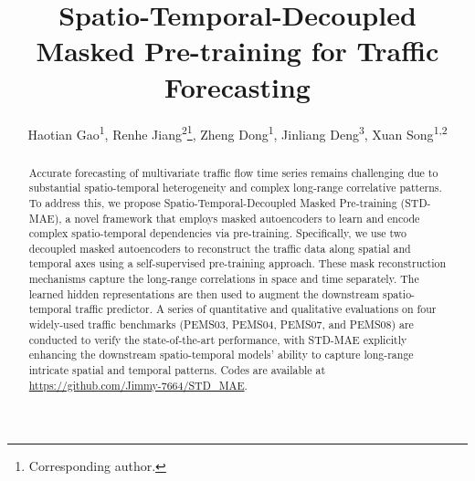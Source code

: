 \documentclass[letterpaper]{article} \usepackage{aaai24}  \usepackage{times}  \usepackage{helvet}  \usepackage{courier}  \usepackage[hyphens]{url}  \usepackage{graphicx} \urlstyle{rm} \def\UrlFont{\rm}  \usepackage{natbib}  \usepackage{caption} \frenchspacing  \setlength{\pdfpagewidth}{8.5in} \setlength{\pdfpageheight}{11in} \usepackage{algorithm}
\title{Spatio-Temporal-Decoupled Masked Pre-training for Traffic Forecasting }
\author{
    Haotian Gao\textsuperscript{\rm 1},
    Renhe Jiang\textsuperscript{\rm 2}\thanks{Corresponding author.},    
    Zheng Dong\textsuperscript{\rm 1},
    Jinliang Deng\textsuperscript{\rm 3},
    Xuan Song\textsuperscript{\rm 1,2}
}
\begin{document}
\maketitle

\begin{abstract}
Accurate forecasting of multivariate traffic flow time series remains challenging due to substantial spatio-temporal heterogeneity and complex long-range correlative patterns. To address this, we propose Spatio-Temporal-Decoupled Masked Pre-training (STD-MAE), a novel framework that employs masked autoencoders to learn and encode complex spatio-temporal dependencies via pre-training. Specifically, we use two decoupled masked autoencoders to reconstruct the traffic data along spatial and temporal axes using a self-supervised pre-training approach. These mask reconstruction mechanisms capture the long-range correlations in space and time separately. The learned hidden representations are then used to augment the downstream spatio-temporal traffic predictor. A series of quantitative and qualitative evaluations on four widely-used traffic benchmarks (PEMS03, PEMS04, PEMS07, and PEMS08) are conducted to verify the state-of-the-art performance, with STD-MAE explicitly enhancing the downstream spatio-temporal models' ability to capture long-range intricate spatial and temporal patterns. Codes are available at \url{https://github.com/Jimmy-7664/STD_MAE}.
\end{abstract}
\end{document}
